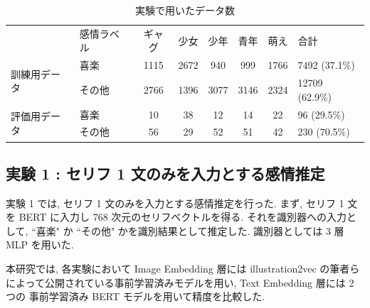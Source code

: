 \begin{table}[!ht]
\begin{center}
\caption{実験で用いたデータ数} %
\label{table:data_exp} %
\begin{tabular}{llccccc|l}
\hline
\multirow{2}{*}{}       & \multirow{2}{*}{感情ラベル} & \multirow{2}{*}{ギャグ} & \multirow{2}{*}{少女} & \multirow{2}{*}{少年} & \multirow{2}{*}{青年} & \multirow{2}{*}{萌え} & \multirow{2}{*}{合計} \\
                        &                        &                      &                     &                     &                     &                     &                     \\ \hline
\multirow{2}{*}{訓練用データ} & 喜楽                     & 1115                 & 2672                & 940                 & 999                 & 1766                & 7492 (37.1\%)       \\
                        & その他                    & 2766                 & 1396                & 3077                & 3146                & 2324                & 12709 (62.9\%)      \\ \hline
\multirow{2}{*}{評価用データ} & 喜楽                     & 10                   & 38                  & 12                  & 14                  & 22                  & 96 (29.5\%)         \\
                        & その他                    & 56                   & 29                  & 52                  & 51                  & 42                  & 230 (70.5\%)
\end{tabular}
\end{center}
\end{table}


\changeindent{0cm}
\subsection{実験 1 : セリフ 1 文のみを入力とする感情推定}
\changeindent{2cm}

実験 1 では, セリフ 1 文のみを入力とする感情推定を行った.
まず, セリフ 1 文を BERT に入力し 768 次元のセリフベクトルを得る.
それを識別器への入力として, ``喜楽" か ``その他" かを識別結果として推定した.
識別器としては 3 層 MLP を用いた.

本研究では, 各実験において Image Embedding 層には illustration2vec の筆者らによって公開されている事前学習済みモデルを用い, Text Embedding 層には 2 つの 事前学習済み BERT モデルを用いて精度を比較した.

